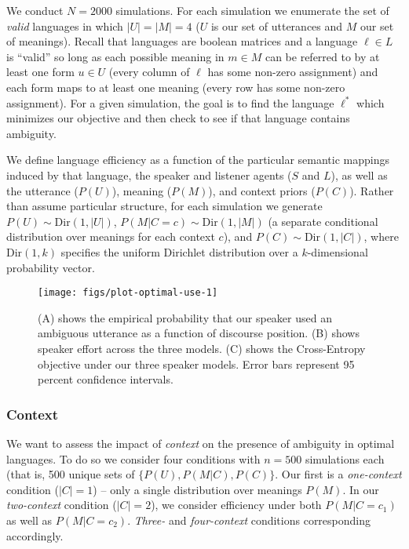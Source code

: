 \documentclass[10pt, letterpaper]{article}
\newenvironment{CodeChunk}{}{}
\begin{document}
We conduct \(N=2000\) simulations. For each simulation we enumerate the
set of \emph{valid} languages in which \(|U|=|M|=4\) (\(U\) is our set
of utterances and \(M\) our set of meanings). Recall that languages are
boolean matrices and a language \(\ell \in L\) is ``valid'' so long as
each possible meaning in \(m \in M\) can be referred to by at least one
form \(u \in U\) (every column of \(\ell\) has some non-zero assignment)
and each form maps to at least one meaning (every row has some non-zero
assignment). For a given simulation, the goal is to find the language
\(\ell^*\) which minimizes our objective and then check to see if that
language contains ambiguity.\par

We define language efficiency as a function of the particular semantic
mappings induced by that language, the speaker and listener agents
(\(S\) and \(L\)), as well as the utterance (\(P(U)\)), meaning
(\(P(M)\)), and context priors (\(P(C)\)). Rather than assume particular
structure, for each simulation we generate
\(P(U) \sim \text{Dir}(1, |U|)\), \(P(M|C=c) \sim \text{Dir}(1, |M|)\)
(a separate conditional distribution over meanings for each context
\(c\)), and \(P(C) \sim \text{Dir}(1, |C|)\), where \(\text{Dir}(1, k)\)
specifies the uniform Dirichlet distribution over a \(k\)-dimensional
probability vector.\par

\begin{CodeChunk}
\begin{figure*}[h]

{\centering \texttt{[image: figs/plot-optimal-use-1]} 

}

\caption[(A) shows the empirical probability that our speaker used an ambiguous utterance as a function of discourse position]{(A) shows the empirical probability that our speaker used an ambiguous utterance as a function of discourse position. (B) shows speaker effort across the three models. (C) shows the Cross-Entropy objective under our three speaker models. Error bars represent 95 percent confidence intervals.}\label{fig:plot-optimal-use}
\end{figure*}
\end{CodeChunk}

\subsubsection{Context}\label{context}

We want to assess the impact of \emph{context} on the presence of
ambiguity in optimal languages. To do so we consider four conditions
with \(n=500\) simulations each (that is, 500 unique sets of
\(\{P(U), P(M|C), P(C)\}\). Our first is a \textit{one-context}
condition (\(|C|=1\)) -- only a single distribution over meanings
\(P(M)\). In our \textit{two-context} condition (\(|C| = 2\)), we
consider efficiency under both \(P(M|C=c_1)\) as well as \(P(M|C=c_2)\).
\textit{Three-} and \textit{four-context} conditions corresponding
accordingly.\par
\end{document}
